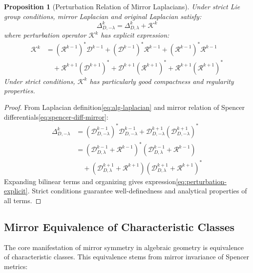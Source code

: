 \documentclass[a4paper,12pt]{extarticle}
\newtheorem{proposition}[theorem]{Proposition}
\theoremstyle{definition}
\begin{document}
\begin{proposition}[Perturbation Relation of Mirror Laplacians]
Under strict Lie group conditions, mirror Laplacian and original Laplacian satisfy:
\begin{equation}\label{eq:laplacian-mirror}
\Delta^k_{D,-\lambda} = \Delta^k_{D,\lambda} + \mathcal{K}^k
\end{equation}
where perturbation operator $\mathcal{K}^k$ has explicit expression:
\begin{align}\label{eq:perturbation-explicit}
\mathcal{K}^k &= (\mathcal{R}^{k-1})^* \mathcal{D}^{k-1} + (\mathcal{D}^{k-1})^* \mathcal{R}^{k-1} + (\mathcal{R}^{k-1})^* \mathcal{R}^{k-1} \\
&\quad + \mathcal{R}^{k+1} (\mathcal{D}^{k+1})^* + \mathcal{D}^{k+1}(\mathcal{R}^{k+1})^* + \mathcal{R}^{k+1}(\mathcal{R}^{k+1})^*
\end{align}
Under strict conditions, $\mathcal{K}^k$ has particularly good compactness and regularity properties.
\end{proposition}

\begin{proof}
From Laplacian definition\eqref{eq:alg-laplacian} and mirror relation of Spencer differentials\eqref{eq:spencer-diff-mirror}:
\begin{align}
\Delta^k_{D,-\lambda} &= (\mathcal{D}^{k-1}_{D,-\lambda})^* \mathcal{D}^{k-1}_{D,-\lambda} + \mathcal{D}^{k+1}_{D,-\lambda}(\mathcal{D}^{k+1}_{D,-\lambda})^* \\
&= (\mathcal{D}^{k-1}_{D,\lambda} + \mathcal{R}^{k-1})^* (\mathcal{D}^{k-1}_{D,\lambda} + \mathcal{R}^{k-1}) \\
&\quad + (\mathcal{D}^{k+1}_{D,\lambda} + \mathcal{R}^{k+1})(\mathcal{D}^{k+1}_{D,\lambda} + \mathcal{R}^{k+1})^*
\end{align}
Expanding bilinear terms and organizing gives expression\eqref{eq:perturbation-explicit}. Strict conditions guarantee well-definedness and analytical properties of all terms.
\end{proof}

\subsection{Mirror Equivalence of Characteristic Classes}

The core manifestation of mirror symmetry in algebraic geometry is equivalence of characteristic classes. This equivalence stems from mirror invariance of Spencer metrics:
\end{document}
